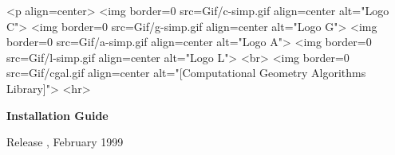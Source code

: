 
\pagestyle{empty}

\begin{titlepage}
  \mbox{} 
  \vspace{3cm}
  \ccTexHtml 
  {\centerline{
        }}
  {<p align=center>
    <img border=0 src=Gif/c-simp.gif align=center alt="Logo C">
    <img border=0 src=Gif/g-simp.gif align=center alt="Logo G">
    <img border=0 src=Gif/a-simp.gif align=center alt="Logo A">
    <img border=0 src=Gif/l-simp.gif align=center alt="Logo L">
    <br>
    <img border=0 src=Gif/cgal.gif align=center 
    alt="[Computational Geometry Algorithms Library]">
    <hr>}

  \vspace{2cm}
  \centerline{ {\huge{\bf Installation Guide}} }
  
  \vspace{2cm}
  \newcommand{\mydate}{February 1999}
  \ccTexHtml
  {\renewcommand{\mydate}{\ifcase\the\month \or January\or
      February\or March\or April\or May\or June\or July\or August\or
      September\or October\or November\or December\fi\ \the\year}}{}
  \centerline{ {\large Release \cgalrelease, \mydate} }
\end{titlepage}

%
\pagestyle{plain}
\setcounter{page}{0}
\cleardoublepage

